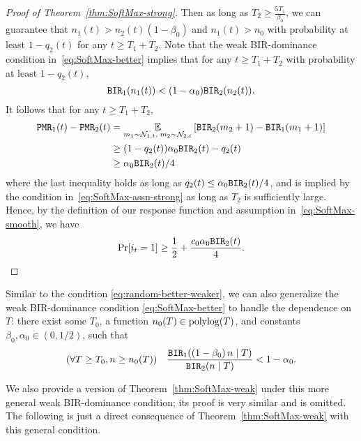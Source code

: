 \begin{proof}[Proof of Theorem~\ref{thm:SoftMax-strong}]
Then as long as
$T_2 \geq \frac{5T_1}{\beta_0}$, we can guarantee that
$n_1(t) > n_2(t) (1 - \beta_0)$ and $n_1(t) > n_0$ with probability at
least $1 - q_2(t)$ for any $t \geq T_1 + T_2$.
Note that the weak BIR-dominance condition
in~\eqref{eq:SoftMax-better} implies that for any $t\geq T_1 + T_2$
with probability at least $1 - q_2(t)$,
\[
  \mathtt{BIR}_1(n_1(t)) < (1- \alpha_0)\mathtt{BIR}_2(n_2(t)).
\]
It follows that for any $t\geq T_1 + T_2$,
\begin{align*}
  \mathtt{PMR}_1(t) - \mathtt{PMR}_2(t) &= \operatorname*{\mathbb{E}}_{m_1\sim \mathcal{N}_{1,t},\;m_2\sim \mathcal{N}_{2,t}}\left[\mathtt{BIR}_2(m_2+ 1) - \mathtt{BIR}_1(m_1+1)\right] \\
                        &\geq (1 - q_2(t))\alpha_0 \mathtt{BIR}_2(t) - q_2(t)\\
                        &\geq \alpha_0 \mathtt{BIR}_2(t)/4
\end{align*}
where the last inequality holds as long as
$q_2(t) \leq \alpha_0\mathtt{BIR}_2(t)/4$, and is implied by the condition
in~\eqref{eq:SoftMax-assn-strong} as long as $T_2$ is sufficiently
large. Hence, by the definition of our \SoftMaxRandom response
function and assumption in~\eqref{eq:SoftMax-smooth}, we have
\[
  \Pr[i_t = 1] \geq \frac{1}{2} + \frac{c_0\alpha_0\mathtt{BIR}_2(t)}{4}. \qedhere
\]
\end{proof}



Similar to the condition \eqref{eq:random-better-weaker}, we can also
generalize the weak BIR-dominance condition \eqref{eq:SoftMax-better}
to handle the dependence on $T$: there exist some $T_0$, a function
$n_0(T)\in \polylog(T)$, and constants $\beta_0,\alpha_0\in (0, 1/2)$, such that 
\begin{align}\label{eq:SoftMax-better-weaker}
(\forall T\geq T_0,  n\geq n_0(T)) \quad
\frac{\mathtt{BIR}_1((1-\beta_0)\, n\mid T)}{\mathtt{BIR}_2(n\mid T)} <1-\alpha_0.
\end{align}

We also provide a version of Theorem~\ref{thm:SoftMax-weak} under this
more general weak BIR-dominance condition; its proof is very similar
and is omitted. The following is just a direct consequence of
Theorem~\ref{thm:SoftMax-weak} with this general condition.




